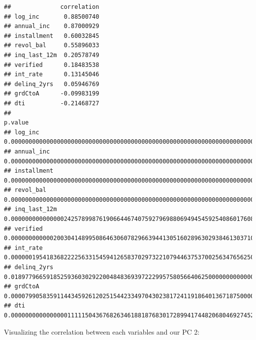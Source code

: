 \documentclass[]{article}
\newenvironment{Shaded}{\begin{snugshade}}{\end{snugshade}}
\newcommand{\DecValTok}[1]{\textcolor[rgb]{0.00,0.00,0.81}{#1}}
\newcommand{\KeywordTok}[1]{\textcolor[rgb]{0.13,0.29,0.53}{\textbf{#1}}}
\newcommand{\NormalTok}[1]{#1}
\newcommand{\OperatorTok}[1]{\textcolor[rgb]{0.81,0.36,0.00}{\textbf{#1}}}
\newcommand{\StringTok}[1]{\textcolor[rgb]{0.31,0.60,0.02}{#1}}
\begin{document}
\begin{verbatim}
##              correlation
## log_inc       0.88500740
## annual_inc    0.87000929
## installment   0.60032845
## revol_bal     0.55896033
## inq_last_12m  0.20578749
## verified      0.18483538
## int_rate      0.13145046
## delinq_2yrs   0.05946769
## grdCtoA      -0.09983199
## dti          -0.21468727
##                                                                                                                                                                        p.value
## log_inc      0.000000000000000000000000000000000000000000000000000000000000000000000000000000000000000000000000000000000000000000000000000000000000000000000000000000000000000
## annual_inc   0.000000000000000000000000000000000000000000000000000000000000000000000000000000000000000000000000000000000000000000000000000000000000000000000000000000000000000
## installment  0.000000000000000000000000000000000000000000000000000000000000000000000000000000000000000000000000000000000000000000000000000000000000000000000000000000005262153
## revol_bal    0.000000000000000000000000000000000000000000000000000000000000000000000000000000000000000000000000000000000000000000000000000000014129656050635064265183493681377
## inq_last_12m 0.000000000000000242578998761906644674075927969880694945459254086017608642578125000000000000000000000000000000000000000000000000000000000000000000000000000000000
## verified     0.000000000000200304148995086463060782966394413051602896302938461303710937500000000000000000000000000000000000000000000000000000000000000000000000000000000000000
## int_rate     0.000000195418368222256331545941265837029732210794463753700256347656250000000000000000000000000000000000000000000000000000000000000000000000000000000000000000000
## delinq_2yrs  0.018977966591852593603029220048483693972229957580566406250000000000000000000000000000000000000000000000000000000000000000000000000000000000000000000000000000000
## grdCtoA      0.000079905835911443459261202515442334970430238172411918640136718750000000000000000000000000000000000000000000000000000000000000000000000000000000000000000000000
## dti          0.000000000000000011111504367682634618818768301728994174482068046927452087402343750000000000000000000000000000000000000000000000000000000000000000000000000000000
\end{verbatim}

Visualizing the correlation between each variables and our PC 2:

\begin{Shaded}
\end{Shaded}
\end{document}
